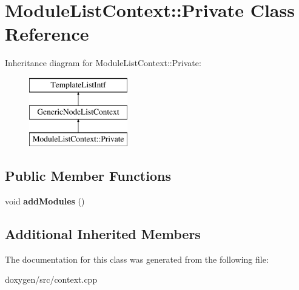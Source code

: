 \hypertarget{class_module_list_context_1_1_private}{}\section{Module\+List\+Context\+::Private Class Reference}
\label{class_module_list_context_1_1_private}
Inheritance diagram for Module\+List\+Context\+::Private\+:\begin{figure}[H]
\begin{center}
\leavevmode
\includegraphics[height=3.000000cm]{class_module_list_context_1_1_private}
\end{center}
\end{figure}
\subsection*{Public Member Functions}
\begin{DoxyCompactItemize}
\item 
\mbox{\label{class_module_list_context_1_1_private_abb460d5cb6a315f40c2c8ad0c4edb6f5}} 
void {\bfseries add\+Modules} ()
\end{DoxyCompactItemize}
\subsection*{Additional Inherited Members}


The documentation for this class was generated from the following file\+:\begin{DoxyCompactItemize}
\item 
doxygen/src/context.\+cpp\end{DoxyCompactItemize}
